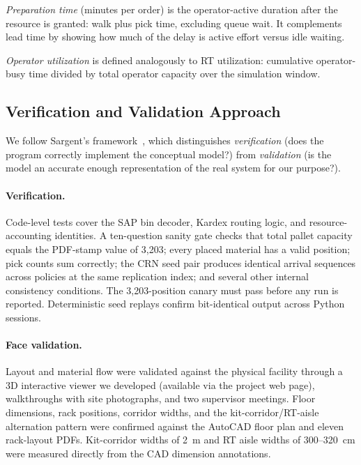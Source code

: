 \emph{Preparation time} (minutes per order) is the operator-active duration
after the resource is granted: walk plus pick time, excluding queue wait. It
complements lead time by showing how much of the delay is active effort versus
idle waiting.

\emph{Operator utilization} is defined analogously to RT utilization:
cumulative operator-busy time divided by total operator capacity over the
simulation window.


\subsection{Verification and Validation Approach}\label{sec:vv}

We follow Sargent's framework~\cite{sargent2013}, which distinguishes
\emph{verification} (does the program correctly implement the conceptual
model?) from \emph{validation} (is the model an accurate enough
representation of the real system for our purpose?).

\paragraph{Verification.}
Code-level tests cover the SAP bin decoder, Kardex routing logic, and
resource-accounting identities. A ten-question sanity gate
checks that total pallet capacity equals
the PDF-stamp value of 3,203; every placed material has a valid position;
pick counts sum correctly; the CRN seed pair produces identical arrival
sequences across policies at the same replication index; and several other
internal consistency conditions. The 3,203-position canary must pass before
any run is reported. Deterministic seed replays confirm bit-identical output
across Python sessions.

\paragraph{Face validation.}
Layout and material flow were validated against the physical facility through
a 3D interactive viewer we developed (available via the project web page),
walkthroughs with site photographs, and two supervisor meetings. Floor
dimensions, rack positions, corridor widths, and the kit-corridor/RT-aisle
alternation pattern were confirmed against the AutoCAD floor plan and eleven
rack-layout PDFs. Kit-corridor widths of 2~m and RT aisle widths of
300--320~cm were measured directly from the CAD dimension annotations.

